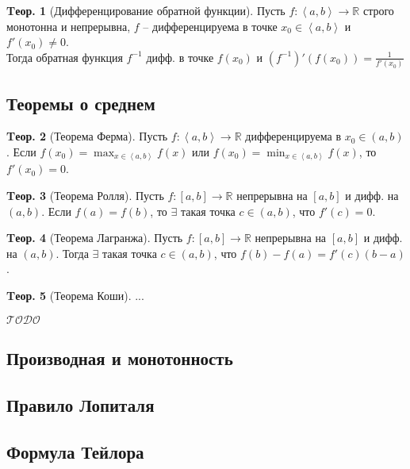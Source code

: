 \documentclass[a4paper,12pt]{article}
\numberwithin{figure}{section}
\theoremstyle{definition}
\theoremstyle{definition}
\newtheorem{theorem}{Tеор.}[section]
\def\DS{\displaystyle}
\def\mathR{\mathbb{R}}
\def\on{\!:}
\def\intab{\left<a,b\right>}
\def\todo {\guillemotleft$\mathcal{TODO}$\guillemotright\textellipsis}
\begin{document}
\medskip
\begin{theorem}[Дифференцирование обратной функции]
	Пусть $f\on\intab\to\mathR$ строго монотонна и непрерывна,
	$f$ -- дифференцируема в точке $x_0 \in\intab$ и $f'(x_0) \ne 0$. \\
	Тогда обратная функция $f^{-1}$ дифф. в точке $f(x_0)$ и
	$\DS \left(f^{-1}\right)'\left(f(x_0)\right) = \frac1{f'(x_0)}$
\end{theorem}


\subsection{Теоремы о среднем}

\begin{theorem}[Теорема Ферма]
	Пусть $f\on\intab\to\mathR$ дифференцируема в $x_0\in(a,b)$.
	Если $\DS f(x_0)=\max_{x\in\intab}f(x)$ или $f(x_0)=\min_{x\in\intab}f(x)$,
	то $f'(x_0)=0$.
\end{theorem}

\begin{theorem}[Теорема Ролля]
	Пусть $f\on[a,b]\to\mathR$ непрерывна на $[a,b]$ и дифф. на $(a,b)$.
	Если $f(a)=f(b)$, то $\exists$ такая точка $c\in(a,b)$, что $f'(c)=0$.
\end{theorem}

\begin{theorem}[Теорема Лагранжа]
	Пусть $f\on[a,b]\to\mathR$ непрерывна на $[a,b]$ и дифф. на $(a,b)$.
	Тогда $\exists$ такая точка $c\in(a,b)$, что $f(b)-f(a)=f'(c)(b-a)$.
\end{theorem}

\begin{theorem}[Теорема Коши]
	...
\end{theorem}

\todo


\subsection{Производная и монотонность}


\subsection{Правило Лопиталя}


\subsection{Формула Тейлора}
\end{document}
